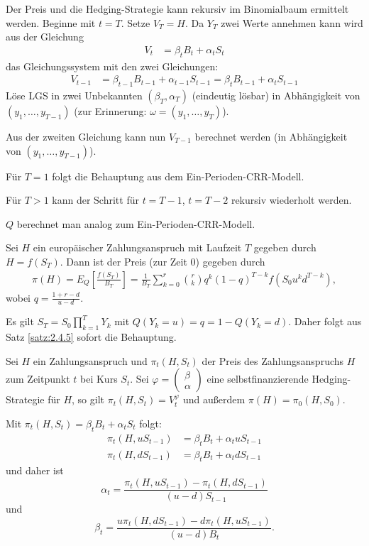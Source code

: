 \documentclass[a4paper,twoside,DIV15,BCOR12mm]{scrbook}
\begin{document}
 \begin{beweis}
 Der Preis und die Hedging-Strategie kann rekursiv im Binomialbaum ermittelt werden. Beginne mit $t=T$. Setze $V_T=H$. Da $Y_T$ zwei Werte annehmen kann wird aus der Gleichung 
 \begin{align*}
 V_t&= \beta_t B_t+ \alpha_t S_t
 \end{align*}
das Gleichungssystem mit den zwei Gleichungen:
 \begin{align*}
 V_{t-1}&= \beta_{t-1}B_{t-1}+\alpha_{t-1}S_{t-1}=\beta_tB_{t-1}+\alpha_tS_{t-1}
 \end{align*}
 Löse LGS in zwei Unbekannten $(\beta_T, \alpha_T)$ (eindeutig lösbar) in Abhängigkeit von $(y_1,\ldots,y_{T-1})$ (zur Erinnerung: $\omega=(y_1,\ldots,y_T)$).

 Aus der zweiten Gleichung kann nun $V_{T-1}$ berechnet werden (in Abhängigkeit von $(y_1,\ldots, y_{T-1})$).

 Für $T=1$ folgt die Behauptung aus dem Ein-Perioden-CRR-Modell.

 Für $T>1$ kann der Schritt für $t=T-1$, $t=T-2$ rekursiv wiederholt werden. 

 $Q$ berechnet man analog zum Ein-Perioden-CRR-Modell.
 \end{beweis}
 \begin{korollar}
 Sei $H$ ein europäischer Zahlungsanspruch mit Laufzeit $T$ gegeben durch $H=f(S_T)$. Dann ist der Preis (zur Zeit 0) gegeben durch
 \begin{align*}
 \pi(H)=E_Q\left[\frac{f(S_T)}{B_T}\right]=\frac{1}{B_T} \sum\limits_{k=0}^r \binom{r}{k} q^k (1-q)^{T-k} f(S_0u^kd^{T-k}),
 \end{align*}
wobei $q=\frac{1+r-d}{u-d}$.
 \end{korollar}
 \begin{beweis}
 Es gilt $S_T=S_0 \prod\limits_{k=1}^T Y_k$ mit $Q(Y_k=u)=q=1-Q(Y_k=d)$. Daher folgt aus Satz \ref{satz:2.4.5} sofort die Behauptung.
 \end{beweis}
 
\begin{bemerkung}
Sei $H$ ein Zahlungsanspruch und $\pi_t(H,S_t)$ der Preis des Zahlungsanspruchs $H$ zum Zeitpunkt $t$ bei Kurs $S_t$. Sei 
$\varphi=\left(\begin{smallmatrix} \beta \\ \alpha \end{smallmatrix}\right)$ 
eine selbstfinanzierende Hedging-Strategie für $H$, so gilt $\pi_t(H,S_t)=V_t^\varphi$ und außerdem $\pi(H) = \pi_0(H,S_0)$.

Mit $\pi_t(H,S_t) = \beta_t B_t + \alpha_t S_t$ folgt:
\begin{align*}
\pi_t(H,u S_{t-1}) &= \beta_t B_t + \alpha_t u S_{t-1} \\
\pi_t(H,d S_{t-1}) &= \beta_t B_t + \alpha_t d S_{t-1}
\end{align*}
und daher ist
\[
\alpha_t = \frac{\pi_t(H,uS_{t-1}) - \pi_t(H,dS_{t-1})}{(u-d) S_{t-1}}
\]
und
\[
\beta_t = \frac{u\pi_t(H,d S_{t-1}) - d\pi_t(H,uS_{t-1})}{(u-d)B_t}.
\]
\end{bemerkung}
\end{document}
